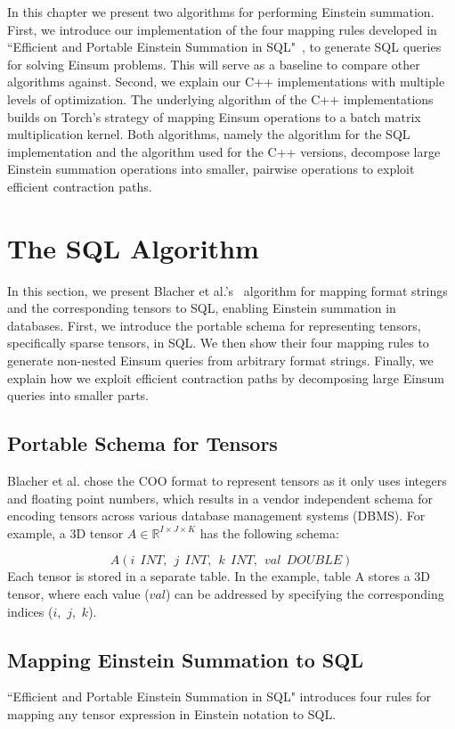 In this chapter we present two algorithms for performing Einstein summation. First,
we introduce our implementation of the four mapping rules developed in ``Efficient and Portable
Einstein Summation in SQL"~\cite{sql_einsum}, to generate SQL queries for solving Einsum problems.
This will serve as a baseline to compare other algorithms against. Second, we explain our C++
implementations with multiple levels of optimization. The underlying algorithm of the C++ 
implementations builds on Torch's strategy of mapping Einsum operations to a batch matrix 
multiplication kernel. Both algorithms, namely the algorithm for the SQL implementation and 
the algorithm used for the C++ versions, decompose large Einstein summation operations
into smaller, pairwise operations to exploit efficient contraction paths.

\section{The SQL Algorithm}
In this section, we present Blacher et al.'s~\cite{sql_einsum} algorithm for mapping format 
strings and the corresponding tensors to SQL, enabling Einstein summation in databases. 
First, we introduce the portable schema for representing tensors, specifically sparse tensors, 
in SQL. We then show their four mapping rules to generate non-nested Einsum queries from 
arbitrary format strings. Finally, we explain how we exploit efficient contraction paths 
by decomposing large Einsum queries into smaller parts.

\subsection{Portable Schema for Tensors}
Blacher et al. chose the COO format to represent tensors as it only uses integers and 
floating point numbers, which results in a vendor independent schema for encoding tensors 
across various database management systems (DBMS). For example, a 3D tensor $A \in 
\mathbb{R}^{I \times J \times K}$ has the following schema:

\[
    A(i\ \ INT,\ \ j\ \ INT,\ \ k\ \ INT,\ \ val\ \ DOUBLE)
\]
%
Each tensor is stored in a separate table. In the example, table A stores a 3D tensor, 
where each value ($val$) can be addressed by specifying the corresponding indices 
($i$,~$j$,~$k$).

\subsection{Mapping Einstein Summation to SQL}
``Efficient and Portable Einstein Summation in SQL" introduces four rules for mapping 
any tensor expression in Einstein notation to SQL.

